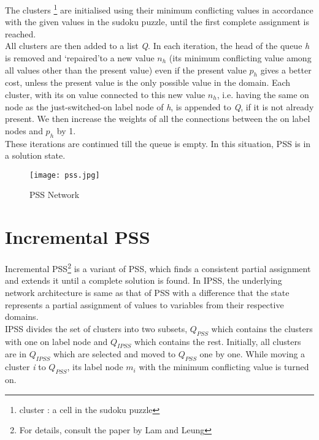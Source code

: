 \documentclass[a4paper]{article}
\begin{document}
The clusters \footnote{cluster : a cell in the sudoku puzzle} are initialised using their minimum conflicting values in accordance with the given values in the sudoku puzzle, until the first complete assignment is reached.\\

All clusters are then added to a list {\em Q}. In each iteration, the head of the queue {\em h} is removed and \lq repaired\rq to a new value $n_h$ (its minimum conflicting value among all values other than the present value) even if the present value $p_h$ gives a better cost, unless the present value is the only possible value in the domain. Each cluster, with its on value connected to this new value $n_h$, i.e. having the same on node as the just-switched-on label node of {\em h}, is appended to {\em Q}, if it is not already present. We then increase the weights of all the connections between the on label nodes and $p_h$ by 1.\\

These iterations are continued till the queue is empty. In this situation, PSS is in a solution state.

\begin{figure}
  \begin{center}
    \texttt{[image: pss.jpg]}
  \end{center}
  \caption{PSS Network}
  \label{fig:pspic}
\end{figure}

\section{Incremental PSS}
Incremental PSS\footnote{For details, consult the paper\cite{mainref} by Lam and Leung} is a variant of PSS, which finds a consistent partial assignment and extends it until a complete solution is found. In IPSS, the underlying network architecture is same as that of PSS with a difference that the state represents a partial assignment of values to variables from their respective domains.\\

IPSS divides the set of clusters into two subsets, $Q_{PSS}$ which contains the clusters with one on label node and $Q_{IPSS}$ which contains the rest. Initially, all clusters are in $Q_{IPSS}$ which are selected and moved to $Q_{PSS}$ one by one. While moving a cluster {\em i} to $Q_{PSS}$, its label node $m_i$ with the minimum conflicting value is turned on.\\
\end{document}
